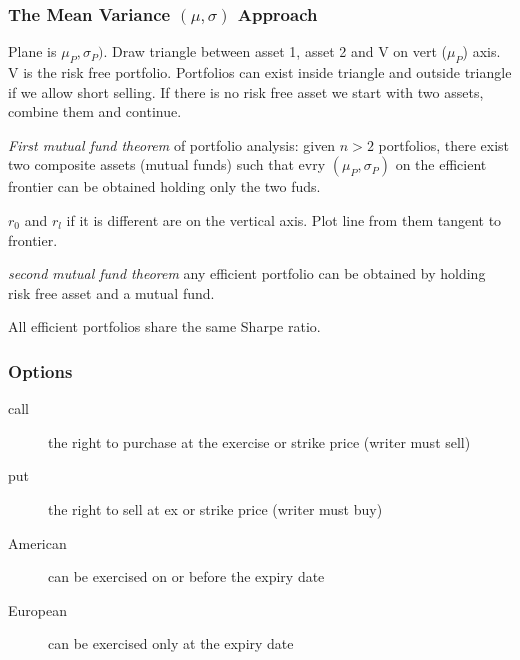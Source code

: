\documentclass[a4paper,12pt]{article}
\begin{document}
\begin{multicols}{2}
\subsubsection*{The Mean Variance $(\mu,\sigma)$ Approach}
Plane is $\mu_P,\sigma_P)$. Draw triangle between asset 1, asset 2 and V on
vert ($\mu_P$) axis. V is the risk free portfolio. Portfolios can exist inside
triangle and outside triangle if we allow short selling. If there is no risk
free asset we start with two assets, combine them and continue.

\emph{First mutual fund theorem} of portfolio analysis: given $n>2$ portfolios,
there exist two composite assets (mutual funds) such that evry
$(\mu_P,\sigma_P)$ on the efficient frontier can be obtained holding only the
two fuds.

$r_0$ and $r_l$ if it is different are on the vertical axis. Plot line from
them tangent to frontier.

\emph{second mutual fund theorem} any efficient portfolio can be obtained by
holding risk free asset and a mutual fund.

All efficient portfolios share the same Sharpe ratio.

%
%
%
%
%
\subsubsection*{Options}
\begin{description}
\item[call] the right to purchase at the exercise or strike price (writer must
sell)
\item[put] the right to sell at ex or strike price (writer must buy)
\item[American] can be exercised on or before the expiry date
\item[European] can be exercised only at the expiry date
\end{description}


\end{multicols}
\end{document}
